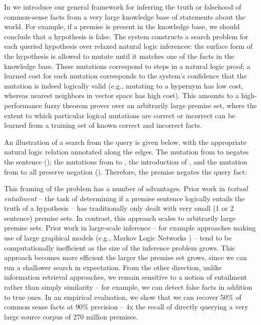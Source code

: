 %
%

In  we introduce our general framework for inferring the truth or 
  falsehood of common-sense facts from a very large knowledge base 
  of statements about the world.
For example, if a premise  is present in the knowledge 
  base, we should conclude that a hypothesis  is false.
The system constructs a search problem for each queried hypothesis over relaxed 
  natural logic inferences: the surface form of the hypothesis is allowed to mutate 
  until it matches one of the facts in the knowledge base.
These mutations correspond to steps in a natural logic proof; a learned cost for each 
  mutation corresponds to the system's confidence that the mutation is indeed 
  logically valid (e.g., mutating to a hypernym has low cost, whereas 
  nearest neighbors in vector space has high cost).
This amounts to a high-performance fuzzy theorem prover over an arbitrarily 
  large premise set, where the extent to which particular logical mutations
  are correct or incorrect can be learned from a training set of known correct
  and incorrect facts.


An illustration of a search from the query  
  is given below, with the appropriate natural logic relation annotated 
  along the edges.
The mutation from  to  negates the sentence (\negate); the mutations
  from  to , the introduction of , and the mutation from
   to  all preserve negation (\reverse).
Therefore, the premise negates the query fact:


\vspace{1cm}
\begin{center}
\teaserSearch
\end{center}
\vspace{1cm}


This framing of the problem has a number of advantages.
Prior work in \textit{textual entailment} -- the task of determining if a premise sentence logically entails the
  truth of a hypothesis -- has traditionally only dealt with very small (1 or 2 sentence) premise sets.
In contrast, this approach scales to arbitrarily large premise sets.
Prior work in large-scale inference -- for example approaches making use of large graphical
  models (e.g., Markov Logic Networks \cite{key:2006richardson-mln}) -- tend to be
  computationally inefficient as the size of the inference problem grows.
This approach becomes more efficient the larger the premise set grows, since we can run
  a shallower search in expectation.
From the other direction, unlike information retrieval approaches, we remain 
  sensitive to a notion of entailment rather than simply similarity -- for example, 
  we can detect false facts in addition to true ones.
In an empirical evaluation, we show that we can recover 50\% of common sense facts 
  at 90\% precision -- 4x the recall of directly querying 
  a very large source corpus of 270 million premises.



